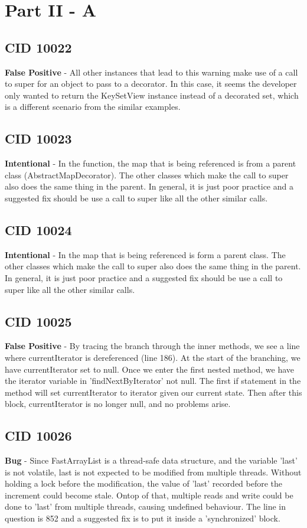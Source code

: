 \documentclass[12pt]{article}
\begin{document}
\section{Part II - A}
\subsection{CID 10022}
\textbf{False Positive} - All other instances that lead to this warning make use of a call to super for an object to pass to a decorator. In this case, it seems the developer only wanted to return the KeySetView instance instead of a decorated set, which is a different scenario from the similar examples.
\subsection{CID 10023}
\textbf{Intentional} - In the function, the map that is being referenced is from a parent class (AbstractMapDecorator). The other classes which make the call to super also does the same thing in the parent. In general, it is just poor practice and a suggested fix should be use a call to super like all the other similar calls.
\subsection{CID 10024}
\textbf{Intentional} - In the map that is being referenced is form a parent class. The other classes which make the call to super also does the same thing in the parent. In general, it is just poor practice and a suggested fix should be use a call to super like all the other similar calls.
\subsection{CID 10025}
\textbf{False Positive} - By tracing the branch through the inner methods, we see a line where currentIterator is dereferenced (line 186). At the start of the branching, we have currentIterator set to null. Once we enter the first nested method, we have the iterator variable in 'findNextByIterator' not null. The first if statement in the method will set currentIterator to iterator given our current state. Then after this block, currentIterator is no longer null, and no problems arise.
\subsection{CID 10026}
\textbf{Bug} - Since FastArrayList is a thread-safe data structure, and the variable 'last' is not volatile, last is not expected to be modified from multiple threads. Without holding a lock before the modification, the value of 'last' recorded before the increment could become stale. Ontop of that, multiple reads and write could be done to 'last' from multiple threads, causing undefined behaviour. The line in question is 852 and a suggested fix is to put it inside a 'synchronized' block.
\end{document}
